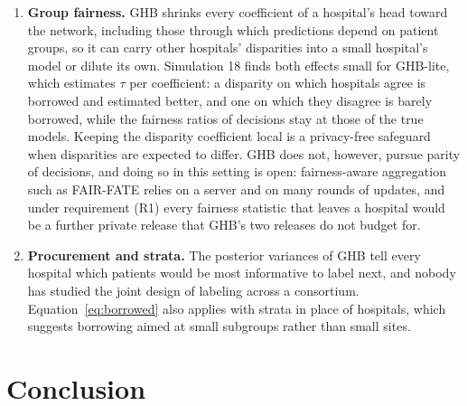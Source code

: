 \documentclass[acmsmall,screen,review]{acmart}
\theoremstyle{acmdefinition}
\begin{document}
\begin{enumerate}[leftmargin=*,itemsep=3pt]
\item \textbf{Group fairness.} GHB shrinks every coefficient of a hospital's head toward the network, including those through which predictions depend on patient groups, so it can carry other hospitals' disparities into a small hospital's model or dilute its own. Simulation 18 finds both effects small for GHB-lite, which estimates $\tau$ per coefficient: a disparity on which hospitals agree is borrowed and estimated better, and one on which they disagree is barely borrowed, while the fairness ratios of decisions stay at those of the true models. Keeping the disparity coefficient local is a privacy-free safeguard when disparities are expected to differ. GHB does not, however, pursue parity of decisions, and doing so in this setting is open: fairness-aware aggregation such as FAIR-FATE \cite{salazar2023fairfate} relies on a server and on many rounds of updates, and under requirement (R1) every fairness statistic that leaves a hospital would be a further private release that GHB's two releases do not budget for.
\item \textbf{Procurement and strata.} The posterior variances of GHB tell every hospital which patients would be most informative to label next, and nobody has studied the joint design of labeling across a consortium. Equation~\eqref{eq:borrowed} also applies with strata in place of hospitals, which suggests borrowing aimed at small subgroups rather than small sites.
\end{enumerate}

\section{Conclusion}\label{sec:conclusion}
\end{document}
